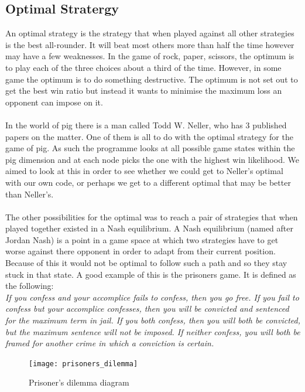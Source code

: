 \documentclass[a4paper,titlepage]{article}
\begin{document}
\subsection{Optimal Stratergy}
An optimal strategy is the strategy that when played against all other strategies is the best all-rounder. It will beat most others more than half the time however may have a few weaknesses. In the game of rock, paper, scissors, the optimum is to play each of the three choices about a third of the time. However, in some game the optimum is to do something destructive. The optimum is not set out to get the best win ratio but instead it wants to minimise the maximum loss an opponent can impose on it.
\\ \\In the world of pig there is a man called Todd W. Neller, who has 3 published papers on the matter. One of them is all to do with the optimal strategy for the game of pig. As such the programme looks at all possible game states within the pig dimension and at each node picks the one with the highest win likelihood. We aimed to look at this in order to see whether we could get to Neller’s optimal with our own code, or perhaps we get to a different optimal that may be better than Neller’s. 
\\ \\The other possibilities for the optimal was to reach a pair of strategies that when played together existed in a Nash equilibrium. A Nash equilibrium (named after Jordan Nash) is a point in a game space at which two strategies have to get worse against there opponent in order to adapt from their current position. Because of this it would not be optimal to follow such a path and so they stay stuck in that state. A good example of this is the prisoners game. It is defined as the following: \\
\textit{If you confess and your accomplice fails to confess, then you go free. If you fail to confess but your accomplice confesses, then you will be convicted and sentenced for the maximum term in jail. If you both confess, then you will both be convicted, but the maximum sentence will not be imposed. If neither confess, you will both be framed for another crime in which a conviction is certain.}\\

\begin{figure}
\centering
\texttt{[image: prisoners\_dilemma]}
\caption{Prisoner's dilemma diagram\label{figure3}}
\end{figure}
\end{document}
